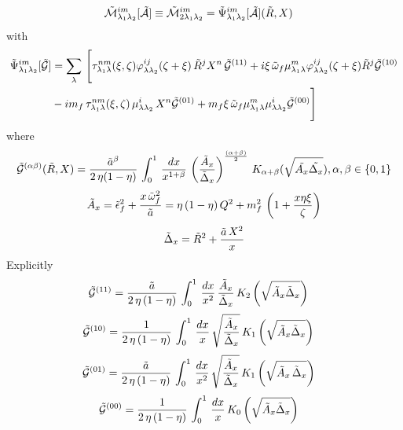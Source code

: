 \documentclass[9pt]{article}
\numberwithin{equation}{section}
\begin{document}
\begin{align}
\mathcal{\Tilde{M}}^{im}_{\lambda_{1}\lambda_{2}}[\mathcal{\Tilde{A}}] \equiv \mathcal{\Tilde{M}}^{im}_{2\lambda_{1}\lambda_{2}} &  = \Tilde{\Psi}^{im}_{\lambda_{1}\lambda_{2}}[\mathcal{\Tilde{A}}] (\Tilde{R},X)
\end{align}
with 
\begin{align}
    \Tilde{\Psi}^{im}_{\lambda_{1}\lambda_{2}}[\mathcal{\Tilde{G}}] & = \sum_{\lambda}\, \Bigg[\tau^{nm}_{\lambda_{1}\lambda}(\xi,\zeta)\varphi^{ij}_{\lambda\lambda_{2}}(\zeta + \xi)\,\Tilde{R}^{j}X^{n}\,\mathcal{\Tilde{G}}^{(11)}+i\xi\,\Tilde{\omega}_{f}\mu^{m}_{\lambda_{1}\lambda}\varphi^{ij}_{\lambda\lambda_{2}}(\zeta + \xi)\Tilde{R}^{j}\mathcal{\Tilde{G}}^{(10)}\notag \\ & -im_{f}\,\tau^{nm}_{\lambda_{1}\lambda}(\xi,\zeta)\,\mu^{i}_{\lambda\lambda_{2}}\,X^{n}\mathcal{\Tilde{G}}^{(01)} + m_{f}\xi\,\Tilde{\omega}_{f}\mu^{m}_{\lambda_{1}\lambda}\mu^{i}_{\lambda\lambda_{2}}\mathcal{\Tilde{G}}^{(00)}\Bigg]
\end{align}
where
$$\mathcal{\Tilde{G}}^{(\alpha\beta)}(\Tilde{R},X) = \frac{\Tilde{a}^{\beta}}{2\,\eta(1-\eta)}\,\int_{0}^{1}\, \frac{dx}{x^{1+\beta}}\, \left(\frac{\Tilde{A}_{x}}{\Tilde{\Delta}_{x}}\right)^{\frac{(\alpha + \beta)}{2}}\,K_{\alpha + \beta} (\sqrt{\Tilde{A_{x}}\Tilde{\Delta_{x}}}), \alpha, \beta \in \{0,1\}$$
$$\Tilde{A}_{x} = \Tilde{\epsilon}^{2}_{f} + \frac{x\,\Tilde{\omega}^{2}_{f}}{\Tilde{a}} = \eta\,(1-\eta)\,Q^{2} +m^{2}_{f}\,\left(1+\frac{x\eta\xi}{\zeta}\right)$$
$$\Tilde{\Delta}_{x} = \Tilde{R}^{2} + \frac{\Tilde{a}\,X^{2}}{x}$$
Explicitly
\begin{align}
    \mathcal{\Tilde{G}}^{(11)} & = \frac{\Tilde{a}}{2\,\eta\, (1-\eta)}\, \int_{0}^{1}\, \frac{dx}{x^{2}}\, \frac{\Tilde{A}_{x}}{\Tilde{\Delta}_{x}}\,K_{2}\left(\sqrt{\Tilde{A}_{x}\Tilde{\Delta}_{x}}\right)
\end{align}
\begin{align}
    \mathcal{\Tilde{G}}^{(10)} & = \frac{1}{2\, \eta\, (1-\eta)}\, \int_{0}^{1}\, \frac{dx}{x}\, \sqrt{\frac{\Tilde{A}_{x}}{\Tilde{\Delta}_{x}}}\, K_{1}\left(\sqrt{\Tilde{A}_{x}\Tilde{\Delta}_{x}}\right)
\end{align}
\begin{align}
     \mathcal{\Tilde{G}}^{(01)} & = \frac{\Tilde{a}}{2\, \eta\, (1-\eta)}\, \int_{0}^{1}\, \frac{dx}{x^{2}}\, \sqrt{\frac{\Tilde{A}_{x}}{\Tilde{\Delta}_{x}}}\, K_{1}\left(\sqrt{\Tilde{A}_{x}\,\Tilde{\Delta}_{x}}\right)
\end{align}
\begin{align}
     \mathcal{\Tilde{G}}^{(00)} & = \frac{1}{2\, \eta\, (1-\eta)}\, \int_{0}^{1}\, \frac{dx}{x}\, K_{0}\left(\sqrt{\Tilde{A}_{x}\Tilde{\Delta}_{x}}\right)
\end{align}
\end{document}
